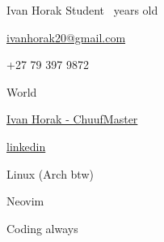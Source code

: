 \documentclass[11pt]{spidercv}
\begin{document}
\begin{TopBar}{\ColorTextSide}
	\Name{\ColorHighlight}
	{Ivan Horak}
	{Student}
	{\number\numexpr{}\relax~years old}

	\begin{DoubleColumns}
		\begin{ItemList}{\ColorHighlight}
			\item [\Large\faAt]
			\href{mailto:ivanhorak20@gmail.com}{ivanhorak20@gmail.com}
			\item [\Large\faMobile] +27 79 397 9872
			\item [\Large\faMapMarker] World
		\end{ItemList}
		\nextcolumn
		\begin{ItemList}{\ColorHighlight}
			\item [\Large\faGithub] \href{https://github.com/ChuufMaster}{Ivan Horak - ChuufMaster}
			\item [\Large\faLinkedin] \href{https://www.linkedin.com/in/ivan-horak-computer-science}{linkedin}
		\end{ItemList}
	\end{DoubleColumns}

	\begin{TripleColumns}
		\begin{ItemList}{\ColorHighlight}
			\item [\Large\iconArch] Linux (Arch btw)
		\end{ItemList}
		\nextcolumn
		\begin{ItemList}{\ColorHighlight}
			\item [\Large\iconNeovim] Neovim
		\end{ItemList}
		\nextcolumn
		\begin{ItemList}{\ColorHighlight}
			\item [] Coding always
		\end{ItemList}
	\end{TripleColumns}
\end{TopBar}
\end{document}
